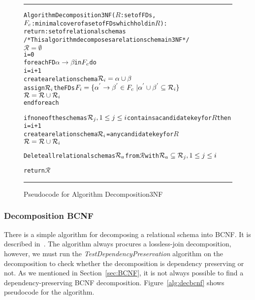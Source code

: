 \begin{figure}[htbp]
\hrule
\vspace{0.25cm}
\begin{alltt}
Algorithm Decomposition3NF(\(R\): set of FDs,
             \(F\sb{c}\): minimal cover of a set of FDs which hold in \(R\)):
          return: set of relational schemas  
/* This algorithm decomposes a relation schema in 3NF */
  \(\mathcal{R} = \emptyset\)
  i = 0
  foreach FD \(\alpha \rightarrow \beta\) in \(F\sb{c}\) do
    i = i + 1
    create a relation schema \(\mathcal{R}\sb{i} = \alpha \cup \beta\)
    assign \(\mathcal{R}\sb{i}\) the FDs  \(F\sb{i} = \{\alpha\sp{'} \rightarrow \beta\sp{'} \in F\sb{c}\ | \alpha\sp{'} \cup \beta\sp{'} \subseteq \mathcal{R}\sb{i}\}\)
    \(\mathcal{R} = \mathcal{R} \cup \mathcal{R}\sb{i}\)
  end foreach
  
  if none of the schemas \(\mathcal{R}\sb{j}, 1\leq{}j\leq{}i\) contains a candidate key for \(R\) then
    i = i + 1
    create a relation schema \(\mathcal{R}\sb{i}\) = any candidate key for \(R\)
    \(\mathcal{R} = \mathcal{R} \cup \mathcal{R}\sb{i}\)
    
  Delete all relational schemas \(\mathcal{R}\sb{a}\) from \(\mathcal{R}\) with \(\mathcal{R}\sb{a} \subseteq \mathcal{R}\sb{j},  1 \leq j \leq i\)
  
  return \(\mathcal{R}\)
\end{alltt}
\caption{Pseudocode for Algorithm Decomposition3NF}\label{alg:dec3nf}
\hrule
\end{figure}

\subsubsection{Decomposition BCNF}
There is a simple algorithm for decomposing a relational schema into BCNF.
It is described in~\cite[Section 6.9]{bdb2}. The algorithm always 
procures a lossless-join decomposition, however, we must run the 
\textit{TestDependencyPreservation} algorithm on
the decomposition to check whether the decomposition is dependency preserving or not. 
As we mentioned in Section~\ref{sec:BCNF},
it is not always possible to find a dependency-preserving BCNF decomposition.
Figure~\ref{alg:decbcnf} shows pseudocode for the algorithm.

